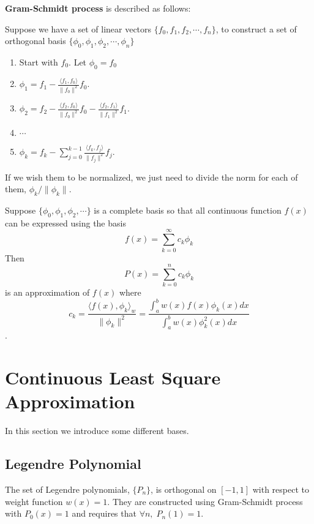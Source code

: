 \begin{thm}
	\textbf{Gram-Schmidt process} is described as follows:
	
	Suppose we have a set of linear vectors $\{f_0, f_1, f_2,\cdots, f_n\}$, to construct a set of orthogonal basis $\{\phi_0, \phi_1, \phi_2,\cdots, \phi_n\}$
	
	\begin{enumerate}
		\item 
		Start with $f_0$. Let $\phi_0 = f_0$
		\item 
		$\phi_1 = f_1 - \frac{\langle f_1,f_0 \rangle}{\| f_0 \|^2}f_0$.
		\item 
		$\phi_2 = f_2 - \frac{\langle f_2,f_0 \rangle}{\| f_0 \|^2}f_0 
		- \frac{\langle f_2,f_1 \rangle}{\| f_1 \|^2}f_1$.
		\item 
		$\cdots$
		\item 
		$\phi_k = f_k - \sum_{j=0}^{k-1}\frac{\langle f_k,f_j \rangle}{\| f_j \|^2}f_j$.
	\end{enumerate}
	
	If we wish them to be normalized, we just need to divide the norm for each of them, $\phi_k/\|\phi_k\|$.
\end{thm}

\begin{thm}
	Suppose $\{\phi_0, \phi_1, \phi_2,\cdots \}$ is a complete basis so that all continuous function $f(x)$ can be expressed using the basis
	\[ f(x)  = \sum_{k=0}^{\infty} c_k\phi_k \]
	Then 
	\[P(x) = \sum_{k=0}^{n} c_k\phi_k\]
	is an approximation of $f(x)$ where 
	\[ c_k = \frac{\langle f(x), \phi_k \rangle_w}{\|\phi_k \|^2} 
	= \frac{\int_a^b w(x)f(x)\phi_k(x)dx}{\int_a^b w(x) \phi_k^2(x)dx} \].
	
\end{thm}

\section{Continuous Least Square Approximation}
In this section we introduce some different bases.

\subsection{Legendre Polynomial}
The set of Legendre polynomials, $\{P_n\}$, is orthogonal on $[-1,1]$ with respect to weight function $w(x)=1$. They are constructed using Gram-Schmidt process with $P_0(x) = 1$ and requires that $\forall n,\;P_n(1) = 1$.

